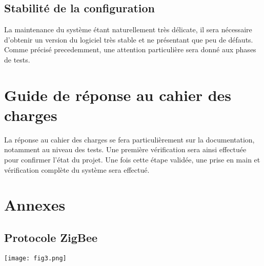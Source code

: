\subsection{Stabilité de la configuration}

La maintenance du système étant naturellement très délicate, il sera nécessaire d'obtenir un version du logiciel très stable et ne présentant que peu de défauts. Comme précisé precedemment, une attention particulière sera donné aux phases de tests.

\section{Guide de réponse au cahier des charges}

La réponse au cahier des charges se fera particulièrement sur la documentation, notamment au niveau des tests. Une première vérification sera ainsi effectuée pour confirmer l'état du projet. Une fois cette étape validée, une prise en main et vérification complète du système sera effectué.

\section{Annexes}
\subsection{Protocole ZigBee}

\texttt{[image: fig3.png]}


